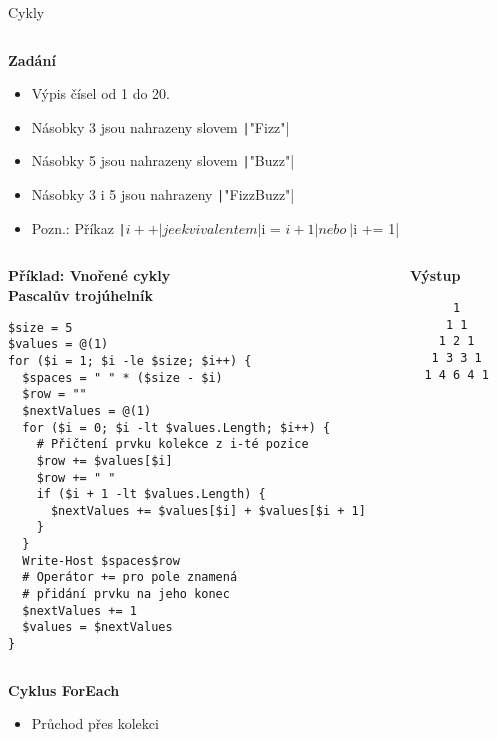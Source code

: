 \documentclass[main.tex]{subfiles}
\begin{document}
\begin{frame}{Cykly}
\begin{columns}[t]
    \begin{column}{0.4\textwidth}
     \textbf{Zadání}
     \begin{itemize}
       \item Výpis čísel od 1 do 20.
       \item Násobky 3 jsou nahrazeny slovem \texttt|"Fizz"|
       \item Násobky 5 jsou nahrazeny slovem \texttt|"Buzz"|
       \item Násobky 3 i 5 jsou nahrazeny \texttt|"FizzBuzz"|
       \item Pozn.: Příkaz \texttt|$i++| je ekvivalentem \texttt|$i = $i + 1| nebo~\texttt|$i += 1|
     \end{itemize}
    \end{column}
  \end{columns}
\framebreak
\begin{columns}
  \begin{column}{0.70\textwidth}
  \textbf{Příklad: Vnořené cykly\\Pascalův trojúhelník}
  \begin{verbatim}
$size = 5
$values = @(1)
for ($i = 1; $i -le $size; $i++) {
  $spaces = " " * ($size - $i)
  $row = ""
  $nextValues = @(1)
  for ($i = 0; $i -lt $values.Length; $i++) {
    # Přičtení prvku kolekce z i-té pozice
    $row += $values[$i]
    $row += " "
    if ($i + 1 -lt $values.Length) {
      $nextValues += $values[$i] + $values[$i + 1]
    }
  }
  Write-Host $spaces$row
  # Operátor += pro pole znamená
  # přidání prvku na jeho konec
  $nextValues += 1
  $values = $nextValues 
}
  \end{verbatim}
  \end{column}
  \begin{column}{0.215\textwidth}
    \begin{center}
    \textbf{Výstup}
    \begin{verbatim}
      1
     1 1
    1 2 1
   1 3 3 1
  1 4 6 4 1
    \end{verbatim}
    \end{center}
  \end{column}
\end{columns}
\framebreak
\textbf{Cyklus ForEach}
\begin{itemize}
  \item Průchod přes kolekci
\end{itemize}
  \begin{center}

\end{center}
\end{frame}
\end{document}
